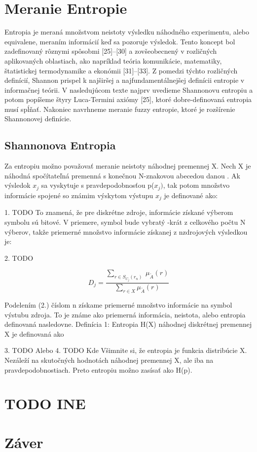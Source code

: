 \pagebreak
\section{Meranie Entropie}
Entropia je meraná množstvom neistoty výsledku náhodného experimentu, alebo equivalene, meraním informácií keď sa pozoruje výsledok. Tento koncept bol zadefinovaný rôznymi spôsobmi [25]–[30] a zovšeobecnený v rozličných aplikovaných oblastiach, ako napríklad teória komunikácie, matematiky, štatistickej termodynamike a ekonómii [31]–[33]. Z pomedzi týchto rozličných definícií, Shannon prispel k najširšej a najfundamentálnejšej definícii entropie v informačnej teórii. V nasledujúcom texte najprv uvedieme Shannonovu entropiu a potom popíšeme štyry Luca-Termini axiómy [25], ktoré dobre-definovaná entropia musí spĺňať. Nakoniec navrhneme meranie fuzzy entropie, ktoré je rozšírenie Shannonovej definície.

\subsection{Shannonova Entropia}
Za entropiu možno považovať meranie neistoty náhodnej premennej X. Nech X je náhodná spočítateľná premenná s konečnou N-znakovou abecedou danou   .
Ak výsledok $x_j$ sa vyskytuje s pravdepodobnosťou p($x_j)$, tak potom množstvo informácie spojené so známim výskytom výstupu $x_j$ je definované ako:

1. TODO
To znamená, že pre diskrétne zdroje, informácie získané výberom symbolu sú bitové. V priemere, symbol  bude vybratý -krát z celkového počtu N výberov, takže priemerné množstvo informácie získanej z nzdrojových výsledkou je:

2. TODO 

\begin{equation}\label{fuzzy}
D_j = \frac{ \sum\limits_{r \in S_{C_{j}}(r_n)  } \: \mu_{\tilde{A}} (r) }{\sum\limits_{r \in X  } \mu_{\tilde{A}} (r) }
\end{equation}




Podelením (2.) číslom n získame priemerné množstvo informácie na symbol výstubu zdroja. To je známe ako priemerná informácia, neistota, alebo entropia definovaná nasledovne.
Definícia 1:  Entropia H(X) náhodnej diskrétnej premennej X je definovaná ako 

3. TODO
Alebo
4.	TODO
Kde
Všimnite si, že entropia je funkcia distribúcie X. Nezáleží na skutočných hodnotách náhodnej premennej X, ale iba na pravdepodobnostiach. Preto entropiu možno zasísať ako H(p).


\section{TODO INE }

\section{Záver}